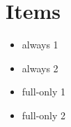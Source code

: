 \hypertarget{items}{%
\section{Items}\label{items}}

\begin{itemize}
\tightlist
\item
  always 1
\item
  always 2
\item
  full-only 1
\item
  full-only 2
\end{itemize}
